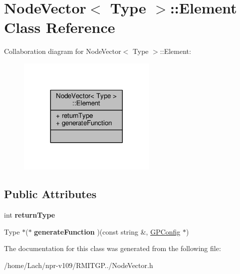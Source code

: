 \hypertarget{classNodeVector_1_1Element}{}\section{Node\+Vector$<$ Type $>$\+:\+:Element Class Reference}
\label{classNodeVector_1_1Element}


Collaboration diagram for Node\+Vector$<$ Type $>$\+:\+:Element\+:
\nopagebreak
\begin{figure}[H]
\begin{center}
\leavevmode
\includegraphics[width=188pt]{classNodeVector_1_1Element__coll__graph}
\end{center}
\end{figure}
\subsection*{Public Attributes}
\begin{DoxyCompactItemize}
\item 
\hypertarget{classNodeVector_1_1Element_a75e5f7179322ec4c3f6b9b62318c2c38}{}\label{classNodeVector_1_1Element_a75e5f7179322ec4c3f6b9b62318c2c38} 
int {\bfseries return\+Type}
\item 
\hypertarget{classNodeVector_1_1Element_a9835441c75670f207457aa1a167fbd37}{}\label{classNodeVector_1_1Element_a9835441c75670f207457aa1a167fbd37} 
Type $\ast$($\ast$ {\bfseries generate\+Function} )(const string \&, \hyperlink{classGPConfig}{G\+P\+Config} $\ast$)
\end{DoxyCompactItemize}


The documentation for this class was generated from the following file\+:\begin{DoxyCompactItemize}
\item 
/home/\+Lach/npr-\/v109/\+R\+M\+I\+T\+G\+P../Node\+Vector.\+h\end{DoxyCompactItemize}
